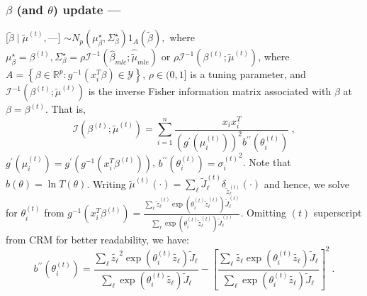 \documentclass[10pt, oneside]{article}   	%
\newcommand{\sy}{\mathcal{Y}}
\newcommand{\R}{\mathbb{R}}
\renewcommand{\sy}{\mathcal{Y}}
\begin{document}
\subsubsection[]{$\beta$ (and $\theta$) update ---} 
$[\widetilde \beta \mid {\widetilde \mu}^{(t)},$---] $\sim N_p(\mu^\star_\beta, \Sigma^\star_\beta) 1_A\left(\widetilde{\beta}\right),$ where $\mu^\star_\beta = \beta^{(t)}, \Sigma^\star_\beta = \rho  \mathcal{I}^{-1}\left(\widehat \beta_{mle} ; \widehat {\widetilde \mu}_{mle}\right) \text{ or } \rho \mathcal{I}^{-1}\left(\beta^{(t)} ; {\widetilde \mu}^{(t)}\right)$, \newline where $A = \left\{\beta \in \R^p :  g^{-1}\left(x_i^T \beta \right) \in \sy \right \}$, $\rho \in (0,1]$ is a tuning parameter, and $\mathcal{I}^{-1}(\beta^{(t)} ; {\widetilde \mu}^{(t)})$ is the inverse Fisher information matrix associated with $\beta$ at $\beta = \beta^{(t)}$. That is,
\[\mathcal{I}\left(\beta^{(t)} ; {\widetilde \mu}^{(t)}\right) = \sum_{i=1}^n  \frac{x_i x_i^T}{\left(g^{\prime}\left(\mu^{(t)}_i\right)\right)^2 b^{\prime \prime}\left(\theta^{(t)}_i\right)} \ ,\]
$g^{\prime}\left(\mu^{(t)}_i\right) = g^{\prime}\left(g^{-1}\left(x_i^T \beta^{(t)}\right)\right)$, $b^{\prime \prime}\left(\theta^{(t)}_i\right) = {\sigma^{(t)}_i}^2$. Note that $b(\theta) = \ln T(\theta)$.
Writing ${\widetilde \mu}^{(t)}(\cdot) = \sum_{\ell} {\widetilde J}^{(t)}_\ell \delta_{{\widetilde z}^{(t)}_\ell}(\cdot)$ and hence, we solve for $\theta^{(t)}_i$ from $g^{-1}\left(x_i^T \beta^{(t)}\right) = \frac{\sum_{\ell} {\widetilde z}^{(t)}_\ell \exp \left(\theta^{(t)}_i {\widetilde z}^{(t)}_\ell\right) {\widetilde J}^{(t)}_\ell}{\sum_{\ell} \exp \left(\theta^{(t)}_i {\widetilde z}^{(t)}_\ell\right) {\widetilde J}^{(t)}_\ell}$. Omitting $(t)$ superscript from CRM for better readability, we have:
\[b^{\prime \prime}\left(\theta^{(t)}_i\right) = \frac{\sum_{\ell} \widetilde{z_\ell}^2 \exp \left(\theta^{(t)}_i \widetilde{z_\ell}\right)  \widetilde J_\ell}{\sum_{\ell} \exp \left(\theta^{(t)}_i \widetilde{z_\ell}\right)  \widetilde J_\ell} - \left[\frac{\sum_{\ell} \widetilde{z_\ell} \exp (\theta^{(t)}_i \widetilde{z_\ell})  \widetilde J_\ell}{\sum_{\ell} \exp (\theta^{(t)}_i \widetilde{z_\ell})  \widetilde J_\ell} \right]^2\ .\]
\end{document}
